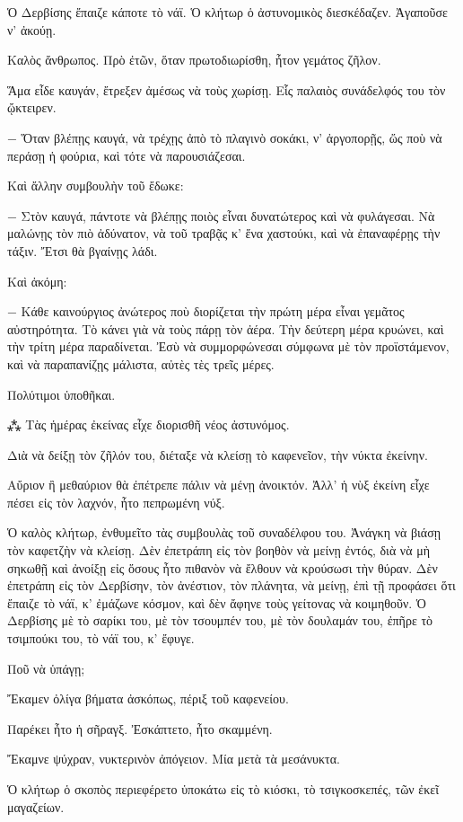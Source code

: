 \documentclass{article}
\begin{document}
Ὁ Δερβίσης ἔπαιζε κάποτε τὸ νάϊ. Ὁ κλήτωρ ὁ ἀστυνομικὸς διεσκέδαζεν. Ἀγαποῦσε ν' ἀκούῃ.

Καλὸς ἄνθρωπος. Πρὸ ἐτῶν, ὅταν πρωτοδιωρίσθη, ἦτον γεμάτος ζῆλον.

Ἅμα εἶδε καυγάν, ἔτρεξεν ἀμέσως νὰ τοὺς χωρίσῃ. Εἷς παλαιὸς συνάδελφός του τὸν ᾤκτειρεν.

− Ὅταν βλέπῃς καυγά, νὰ τρέχῃς ἀπὸ τὸ πλαγινὸ σοκάκι, ν' ἀργοπορῇς, ὥς ποὺ νὰ περάσῃ ἡ φούρια, καὶ τότε νὰ παρουσιάζεσαι.

Καὶ ἄλλην συμβουλὴν τοῦ ἔδωκε:

− Στὸν καυγά, πάντοτε νὰ βλέπῃς ποιὸς εἶναι δυνατώτερος καὶ νὰ φυλάγεσαι. Νὰ μαλώνῃς τὸν πιὸ ἀδύνατον, νὰ τοῦ τραβᾷς κ' ἕνα χαστούκι, καὶ νὰ ἐπαναφέρῃς τὴν τάξιν. Ἔτσι θὰ βγαίνῃς λάδι.

Καὶ ἀκόμη:

− Κάθε καινούργιος ἀνώτερος ποὺ διορίζεται τὴν πρώτη μέρα εἶναι γεμᾶτος αὐστηρότητα. Τὸ κάνει γιὰ νὰ τοὺς πάρῃ τὸν ἀέρα. Τὴν δεύτερη μέρα κρυώνει, καὶ τὴν τρίτη μέρα παραδίνεται. Ἐσὺ νὰ συμμορφώνεσαι σύμφωνα μὲ τὸν προϊστάμενον, καὶ νὰ παραπανίζῃς μάλιστα, αὐτὲς τὲς τρεῖς μέρες.

Πολύτιμοι ὑποθῆκαι.

⁂
Τὰς ἡμέρας ἐκείνας εἶχε διορισθῆ νέος ἀστυνόμος.

Διὰ νὰ δείξῃ τὸν ζῆλόν του, διέταξε νὰ κλείσῃ τὸ καφενεῖον, τὴν νύκτα ἐκείνην.

Αὔριον ἢ μεθαύριον θὰ ἐπέτρεπε πάλιν νὰ μένῃ ἀνοικτόν. Ἀλλ' ἡ νὺξ ἐκείνη εἶχε πέσει εἰς τὸν λαχνόν, ἦτο πεπρωμένη νύξ.

Ὁ καλὸς κλήτωρ, ἐνθυμεῖτο τὰς συμβουλὰς τοῦ συναδέλφου του. Ἀνάγκη νὰ βιάσῃ τὸν καφετζὴν νὰ κλείσῃ. Δὲν ἐπετράπη εἰς τὸν βοηθὸν νὰ μείνῃ ἐντός, διὰ νὰ μὴ σηκωθῇ καὶ ἀνοίξῃ εἰς ὅσους ἦτο πιθανὸν νὰ ἔλθουν νὰ κρούσωσι τὴν θύραν. Δὲν ἐπετράπη εἰς τὸν Δερβίσην, τὸν ἀνέστιον, τὸν πλάνητα, νὰ μείνῃ, ἐπὶ τῇ προφάσει ὅτι ἔπαιζε τὸ νάϊ, κ' ἐμάζωνε κόσμον, καὶ δὲν ἄφηνε τοὺς γείτονας νὰ κοιμηθοῦν. Ὁ Δερβίσης μὲ τὸ σαρίκι του, μὲ τὸν τσουμπέν του, μὲ τὸν δουλαμάν του, ἐπῆρε τὸ τσιμπούκι του, τὸ νάϊ του, κ' ἔφυγε.

Ποῦ νὰ ὑπάγῃ;

Ἔκαμεν ὀλίγα βήματα ἀσκόπως, πέριξ τοῦ καφενείου.

Παρέκει ἦτο ἡ σῆραγξ. Ἐσκάπτετο, ἦτο σκαμμένη.

Ἔκαμνε ψύχραν, νυκτερινὸν ἀπόγειον. Μία μετὰ τὰ μεσάνυκτα.

Ὁ κλήτωρ ὁ σκοπὸς περιεφέρετο ὑποκάτω εἰς τὸ κιόσκι, τὸ τσιγκοσκεπές, τῶν ἐκεῖ μαγαζείων.
\end{document}
